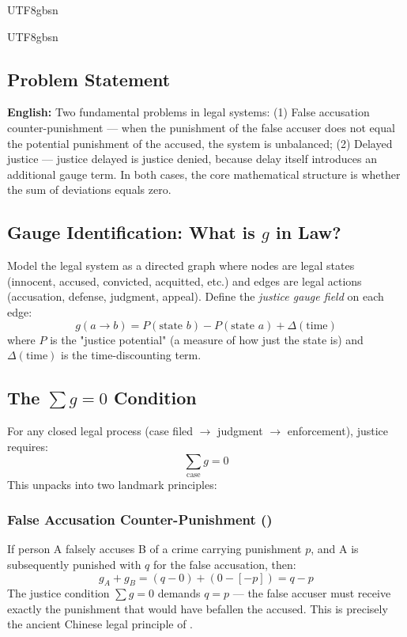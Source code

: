 \documentclass[11pt,a4paper]{article}
\begin{document}
\begin{CJK}{UTF8}{gbsn}
{\begin{CJK}{UTF8}{gbsn}
\subsection{Problem Statement}
\noindent
\vspace{0.3cm}
\noindent
\textbf{English:} Two fundamental problems in legal systems: (1) False accusation
counter-punishment --- when the punishment of the false accuser does not equal the
potential punishment of the accused, the system is unbalanced; (2) Delayed justice ---
justice delayed is justice denied, because delay itself introduces an additional
gauge term. In both cases, the core mathematical structure is whether the sum of
deviations equals zero.
\subsection{Gauge Identification: What is $g$ in Law?}
Model the legal system as a directed graph where nodes are legal states (innocent,
accused, convicted, acquitted, etc.) and edges are legal actions (accusation, defense,
judgment, appeal). Define the \textit{justice gauge field} on each edge:
\begin{equation}
    g(a \to b) = P(\text{state } b) - P(\text{state } a) + \Delta(\text{time})
\end{equation}
where $P$ is the "justice potential" (a measure of how just the state is) and
$\Delta(\text{time})$ is the time-discounting term.
\subsection{The $\sum g = 0$ Condition}
For any closed legal process (case filed $\to$ judgment $\to$ enforcement), justice
requires:
\begin{equation}
    \boxed{\sum_{\text{case}} g = 0}
\end{equation}
This unpacks into two landmark principles:
\subsubsection{False Accusation Counter-Punishment ()}
If person A falsely accuses B of a crime carrying punishment $p$, and A is subsequently
punished with $q$ for the false accusation, then:
\begin{equation}
    g_A + g_B = (q - 0) + (0 - [-p]) = q - p
\end{equation}
The justice condition $\sum g = 0$ demands $q = p$ --- the false accuser must receive
exactly the punishment that would have befallen the accused. This is precisely the
ancient Chinese legal principle of .

\end{CJK}}
\end{CJK}
\end{document}
